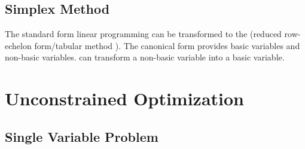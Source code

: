 \documentclass[10pt]{report}
\begin{document}
\subsection{Simplex Method}
The standard form linear programming can be transformed to the  (reduced row-echelon form/tabular method
). The canonical form provides basic variables and non-basic variables.  can transform a non-basic variable
into a basic variable.

\clearpage
\section{Unconstrained Optimization}

\subsection{Single Variable Problem}
\end{document}
